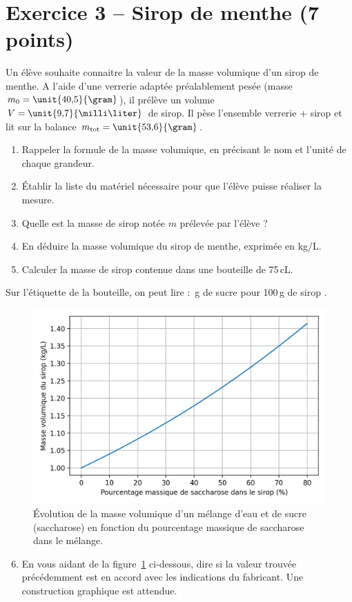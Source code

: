 \section*{Exercice 3 -- Sirop de menthe (7 points)}

Un élève souhaite connaitre la valeur de la masse volumique d'un sirop de menthe.
A l'aide d'une verrerie adaptée préalablement pesée (masse $m_0 = \unit{40{,}5}{\gram}$), il prélève un volume $V=\unit{9{,}7}{\milli\liter}$ de sirop.
Il pèse l'ensemble verrerie + sirop et lit sur la balance $m_\mathrm{tot} = \unit{53{,}6}{\gram}$.
\begin{enumerate}
\item \rco{} Rappeler la formule de la masse volumique, en précisant le nom et l'unité de chaque grandeur.
\item \anarai{} Établir la liste du matériel nécessaire pour que l'élève puisse réaliser la mesure.
\item \app{} \rea{} Quelle est la masse de sirop notée $m$ prélevée par l'élève ?
\item \rea{} En déduire la masse volumique du sirop de menthe, exprimée en kg/L.
\item \app{} Calculer la masse de sirop contenue dans une bouteille de 75\,cL.
\end{enumerate}
Sur l'étiquette de la bouteille, on peut lire : \,g de sucre pour 100\,g de sirop \fg{}.
\begin{figure}[h]
\center
\includegraphics[scale=1]{../images/densite_sirop.png}
\caption{Évolution de la masse volumique d'un mélange d'eau et de sucre (saccharose) en fonction du pourcentage massique de saccharose dans le mélange.}
\label{fig:densite_sirop}
\end{figure}
\begin{enumerate}
\setcounter{enumi}{5}
\item \app{} \rea{} \val{} En vous aidant de la figure~\ref{fig:densite_sirop} ci-dessous, dire si la valeur trouvée précédemment est en accord avec les indications du fabricant.
Une construction graphique est attendue.
\end{enumerate}




